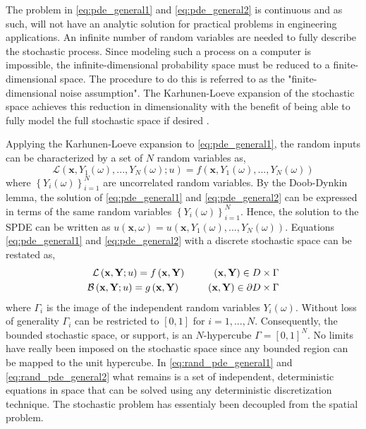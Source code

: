 The problem in \ref{eq:pde_general1} and \ref{eq:pde_general2} is continuous and as such, will not have an analytic solution for practical problems in engineering applications. An infinite number of random variables are needed to fully describe the stochastic process. Since modeling such a process on a computer is impossible, the infinite-dimensional probability space must be reduced to a finite-dimensional space. The procedure to do this is referred to as the "finite-dimensional noise assumption". The Karhunen-Loeve expansion of the stochastic space achieves this reduction in dimensionality with the benefit of being able to fully model the full stochastic space if desired \cite{KarLoeXiu}.

Applying the Karhunen-Loeve expansion to \ref{eq:pde_general1}, the random inputs can be characterized by a set of $N$ random variables as,
\begin{equation} \label{eq:rand_pde_general}
    \mathcal{L}\left(\textbf{x},Y_{1}(\omega),...,Y_{N}(\omega);u\right) = 
     f\left(\textbf{x},Y_{1}(\omega),...,Y_{N}(\omega)\right)
\end{equation}
where $\left\{Y_i(\omega)\right\}_{i=1}^N$ are uncorrelated random variables. By the Doob-Dynkin lemma, the solution of \ref{eq:pde_general1} and \ref{eq:pde_general2} can be expressed in terms of the same random variables $\left\{Y_i(\omega)\right\}_{i=1}^N$. Hence, the solution to the \ac{SPDE} can be written as $u\left(\textbf{x},\omega\right)=u\left(\textbf{x},Y_{1}(\omega),...,Y_{N}(\omega)\right)$. Equations \ref{eq:pde_general1} and \ref{eq:pde_general2} with a discrete stochastic space can be restated as, 
\begin{eqnarray}
\label{eq:rand_pde_general1}
    \mathcal{L}\left(\textbf{x},\textbf{Y};u\right) = 
     f\left(\textbf{x},\textbf{Y}\right) \hspace{1 cm} \left(\textbf{x},
      \textbf{Y}\right)\in D \times \Gamma \\
\label{eq:rand_pde_general2}
    \mathcal{B}\left(\textbf{x},\textbf{Y};u\right) = 
     g\left(\textbf{x},\textbf{Y}\right) \hspace{1 cm} \left(\textbf{x}, 
      \textbf{Y}\right)\in \partial D \times \Gamma 
\end{eqnarray} 
where $\Gamma_i$ is the image of the independent random variables $Y_i\left(\omega\right)$. Without loss of generality $\Gamma_i$ can be restricted to $\left[0,1\right]$ for $i=1,...,N$. Consequently, the bounded stochastic space, or support, is an $N$-hypercube $\Gamma=\left[0,1\right]^N$. No limits have really been imposed on the stochastic space since any bounded region can be mapped to the unit hypercube. In \ref{eq:rand_pde_general1} and \ref{eq:rand_pde_general2} what remains is a set of independent, deterministic equations in space that can be solved using any deterministic discretization technique. The stochastic problem has essentialy been decoupled from the spatial problem.          